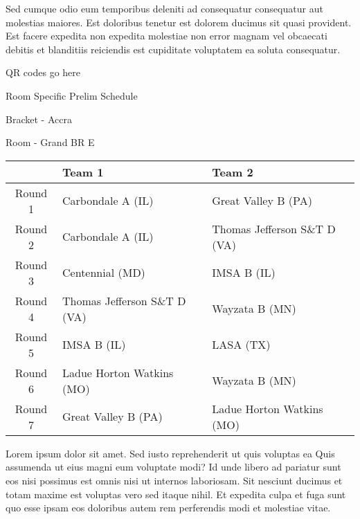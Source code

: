 \documentclass{article}%
\begin{document}
\newline%
Sed cumque odio eum temporibus deleniti ad consequatur consequatur aut molestias maiores. Est doloribus tenetur est dolorem ducimus sit quasi provident. Est facere expedita non expedita molestiae non error magnam vel obcaecati debitis et blanditiis reiciendis est cupiditate voluptatem ea soluta consequatur.%
\vspace*{140pt}%
\begin{center}%
\begin{Huge}%
QR codes go here%
\end{Huge}%
\end{center}%
\newpage%
\begin{center}%
\begin{Huge}%
Room Specific Prelim Schedule%
\end{Huge}%
\vspace*{8pt}%
\linebreak%
\begin{Large}%
Bracket {-} Accra%
\end{Large}%
\vspace*{8pt}%
\linebreak%
\vspace*{8pt}%
\begin{Large}%
Room {-} Grand BR E%
\end{Large}%
\end{center}%
%
\begin{tabularx}{\textwidth}{|c|Y|Y|}%
\hline%
&Team 1&Team 2\\%
\hline%
Round 1&Carbondale A (IL)&Great Valley B (PA)\\%
Round 2&Carbondale A (IL)&Thomas Jefferson S\&T D (VA)\\%
Round 3&Centennial (MD)&IMSA B (IL)\\%
Round 4&Thomas Jefferson S\&T D (VA)&Wayzata B (MN)\\%
Round 5&IMSA B (IL)&LASA (TX)\\%
Round 6&Ladue Horton Watkins (MO)&Wayzata B (MN)\\%
Round 7&Great Valley B (PA)&Ladue Horton Watkins (MO)\\%
\hline%
\end{tabularx}%
\vspace*{8pt}%
\newline%
Lorem ipsum dolor sit amet. Sed iusto reprehenderit ut quis voluptas ea Quis assumenda ut eius magni eum voluptate modi? Id unde libero ad pariatur sunt eos nisi possimus est omnis nisi ut internos laboriosam. Sit nesciunt ducimus et totam maxime est voluptas vero sed itaque nihil. Et expedita culpa et fuga sunt quo esse ipsam eos doloribus autem rem perferendis modi et molestiae vitae.\newline%
\end{document}
